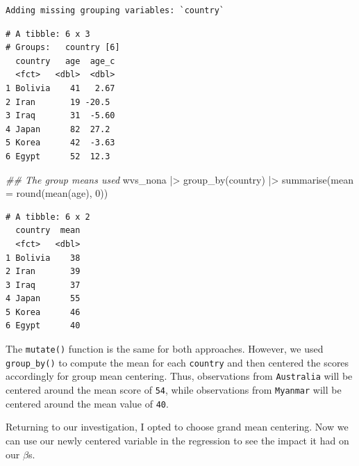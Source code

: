 \documentclass[
  letterpaper,
]{krantz}
\makeatletter
\newenvironment{Shaded}{\begin{snugshade}}{\end{snugshade}}
\newcommand{\AttributeTok}[1]{\textcolor[rgb]{0.40,0.45,0.13}{#1}}
\newcommand{\DecValTok}[1]{\textcolor[rgb]{0.68,0.00,0.00}{#1}}
\newcommand{\DocumentationTok}[1]{\textcolor[rgb]{0.37,0.37,0.37}{\textit{#1}}}
\newcommand{\FunctionTok}[1]{\textcolor[rgb]{0.28,0.35,0.67}{#1}}
\newcommand{\NormalTok}[1]{\textcolor[rgb]{0.00,0.23,0.31}{#1}}
\newcommand{\SpecialCharTok}[1]{\textcolor[rgb]{0.37,0.37,0.37}{#1}}
\newenvironment{kframe}{%
\medskip{}
\setlength{\fboxsep}{.8em}
 \def\at@end@of@kframe{}%
 \ifinner\ifhmode%
  \def\at@end@of@kframe{\end{minipage}}%
  \begin{minipage}{\columnwidth}%
 \fi\fi%
 \def\FrameCommand##1{\hskip\@totalleftmargin \hskip-\fboxsep
 \colorbox{shadecolor}{##1}\hskip-\fboxsep
     \hskip-\linewidth \hskip-\@totalleftmargin \hskip\columnwidth}%
 \MakeFramed {\advance\hsize-\width
   \@totalleftmargin\z@ \linewidth\hsize
   \@setminipage}}%
 {\par\unskip\endMakeFramed%
 \at@end@of@kframe}
\renewenvironment{Shaded}{\begin{kframe}}{\end{kframe}}
\makeatother
\begin{document}
\begin{verbatim}
Adding missing grouping variables: `country`
\end{verbatim}

\begin{verbatim}
# A tibble: 6 x 3
# Groups:   country [6]
  country   age  age_c
  <fct>   <dbl>  <dbl>
1 Bolivia    41   2.67
2 Iran       19 -20.5 
3 Iraq       31  -5.60
4 Japan      82  27.2 
5 Korea      42  -3.63
6 Egypt      52  12.3 
\end{verbatim}

\begin{Shaded}
\begin{Highlighting}[]
\DocumentationTok{\#\# The group means used}
\NormalTok{wvs\_nona }\SpecialCharTok{|\textgreater{}}
  \FunctionTok{group\_by}\NormalTok{(country) }\SpecialCharTok{|\textgreater{}}
  \FunctionTok{summarise}\NormalTok{(}\AttributeTok{mean =} \FunctionTok{round}\NormalTok{(}\FunctionTok{mean}\NormalTok{(age), }\DecValTok{0}\NormalTok{))}
\end{Highlighting}
\end{Shaded}

\begin{verbatim}
# A tibble: 6 x 2
  country  mean
  <fct>   <dbl>
1 Bolivia    38
2 Iran       39
3 Iraq       37
4 Japan      55
5 Korea      46
6 Egypt      40
\end{verbatim}

The \texttt{mutate()} function is the same for both approaches. However,
we used \texttt{group\_by()} to compute the mean for each
\texttt{country} and then centered the scores accordingly for group mean
centering. Thus, observations from \texttt{Australia} will be centered
around the mean score of \texttt{54}, while observations from
\texttt{Myanmar} will be centered around the mean value of \texttt{40}.

Returning to our investigation, I opted to choose grand mean centering.
Now we can use our newly centered variable in the regression to see the
impact it had on our \(\beta\)s.
\end{document}
